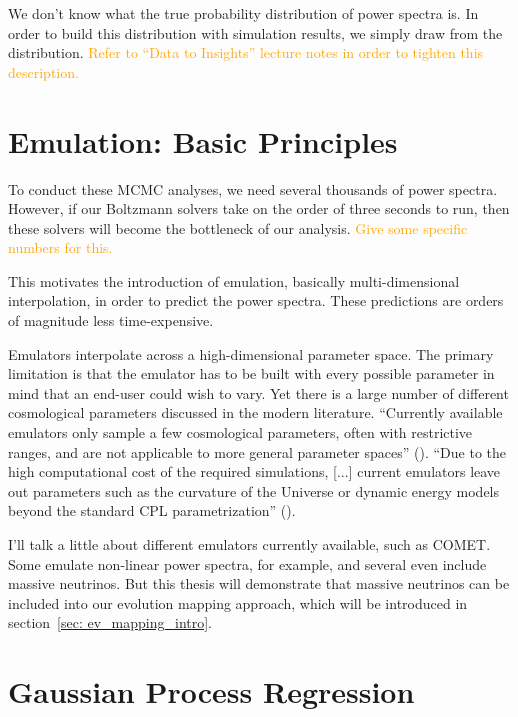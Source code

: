We don't know what the true probability distribution of power spectra is. In order to build this distribution with simulation results, we simply draw from the distribution. \textcolor{orange}{Refer to ``Data to Insights'' lecture notes in order to tighten this description.}

\section{Emulation: Basic Principles}
\label{sec: emulation_intro}

To conduct these MCMC analyses, we need several thousands of power spectra. However, if our Boltzmann solvers take on the order of three seconds to run, then these solvers will become the bottleneck of our analysis. \textcolor{orange}{Give some specific numbers for this.}

This motivates the introduction of emulation, basically multi-dimensional interpolation, in order to predict the power spectra. These predictions are orders of magnitude less time-expensive. 

Emulators interpolate across a high-dimensional parameter space. The primary
limitation is that the emulator has to be built with every possible parameter
in mind that an end-user could wish to vary. Yet there is a large number of
different cosmological parameters discussed in the modern literature.
``Currently available emulators only sample a few cosmological parameters,
often with restrictive ranges, and are not applicable to more general
parameter
spaces'' (). ``Due to the high computational cost of the required
simulations, [...] current emulators leave out parameters such as the
curvature
of the Universe or dynamic energy models beyond the standard CPL
parametrization'' ().

I'll talk a little about different emulators currently available, such as COMET. Some emulate non-linear power spectra, for example, and several even include massive neutrinos. But this thesis will demonstrate that massive neutrinos can be included into our evolution mapping approach, which will be introduced in section~\ref{sec: ev_mapping_intro}.


\section{Gaussian Process Regression}
\label{sec: gpr_intro}

